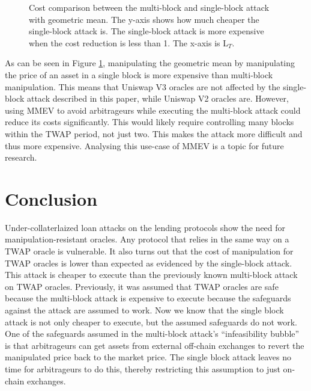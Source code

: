 \begin{figure}[h]
\caption{Cost comparison between the multi-block and single-block attack with geometric mean. The y-axis shows how much cheaper the single-block attack is. The single-block attack is more expensive when the cost reduction is less than 1. The x-axis is L$_T$.}
\label{figure_geometric}
\end{figure}

As can be seen in Figure \ref{figure_geometric}, manipulating the geometric mean by manipulating the price of an asset in a single block is more expensive than multi-block manipulation. This means that Uniswap V3 oracles are not affected by the single-block attack described in this paper, while Uniswap V2 oracles are.
However, using MMEV to avoid arbitrageurs while executing the multi-block attack could reduce its costs significantly. This would likely require controlling many blocks within the TWAP period, not just two. This makes the attack more difficult and thus more expensive. Analysing this use-case of MMEV is a topic for future research.

\section{Conclusion}
Under-collaterlaized loan attacks on the lending protocols show the need for manipulation-resistant oracles. Any protocol that relies in the same way on a TWAP oracle is vulnerable. It also turns out that the cost of manipulation for TWAP oracles is lower than expected as evidenced by the single-block attack. This attack is cheaper to execute than the previously known multi-block attack on TWAP oracles. Previously, it was assumed that TWAP oracles are safe because the multi-block attack is expensive to execute because the safeguards against the attack are assumed to work. Now we know that the single block attack is not only cheaper to execute, but the assumed safeguards do not work. One of the safeguards assumed in the multi-block attack's ``infeasibility bubble'' is that arbitrageurs can get assets from external off-chain exchanges to revert the manipulated price back to the market price. The single block attack leaves no time for arbitrageurs to do this, thereby restricting this assumption to just on-chain exchanges.

